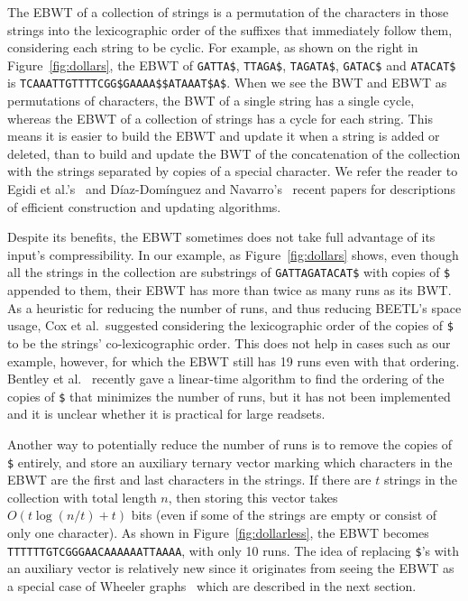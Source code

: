 The EBWT of a collection of strings is a permutation of the characters in those strings into the lexicographic order of the suffixes that immediately follow them, considering each string to be cyclic.  For example, as shown on the right in Figure~\ref{fig:dollars}, the EBWT of {\tt GATTA\$}, {\tt TTAGA\$}, {\tt TAGATA\$}, {\tt GATAC\$} and {\tt ATACAT\$} is {\tt TCAAATTGTTTTCGG\$GAAAA\$\$ATAAAT\$A\$}.  When we see the BWT and EBWT as permutations of characters, the BWT of a single string has a single cycle, whereas the EBWT of a collection of strings has a cycle for each string.  This means it is easier to build the EBWT and update it when a string is added or deleted, than to build and update the BWT of the concatenation of the collection with the strings separated by copies of a special character.  We refer the reader to Egidi et al.'s~\cite{egidi2019external,tcs/EgidiM20} and D\'iaz-Dom\'inguez and Navarro's~\cite{DNdcc21.3} recent papers for descriptions of efficient construction and updating algorithms.

Despite its benefits, the EBWT sometimes does not take full advantage of its input's compressibility.  In our example, as Figure~\ref{fig:dollars} shows, even though all the strings in the collection are substrings of {\tt GATTAGATACAT\$} with copies of {\tt \$} appended to them, their EBWT has more than twice as many runs as its BWT.  As a heuristic for reducing the number of runs, and thus reducing BEETL's space usage, Cox et al.\ suggested considering the lexicographic order of the copies of {\tt \$} to be the strings' co-lexicographic order.  This does not help in cases such as our example, however, for which the EBWT still has 19 runs even with that ordering.  Bentley et al.~\cite{bentley2020complexity} recently gave a linear-time algorithm to find the ordering of the copies of {\tt \$} that minimizes the number of runs, but it has not been implemented and it is unclear whether it is practical for large readsets.

Another way to potentially reduce the number of runs is to remove the copies of {\tt \$} entirely, and store an auxiliary ternary vector marking which characters in the EBWT are the first and last characters in the strings.  If there are $t$ strings in the collection with total length $n$, then storing this vector takes $O (t \log (n / t) + t)$ bits (even if some of the strings are empty or consist of only one character).  As shown in Figure~\ref{fig:dollarless}, the EBWT becomes {\tt TTTTTTGTCGGGAACAAAAAATTAAAA}, with only 10 runs. The idea of replacing {\tt \$}'s with an auxiliary vector is relatively new since it originates from seeing the EBWT as a special case of Wheeler graphs~\cite{gagie2017wheeler} which are described in the next section. 

